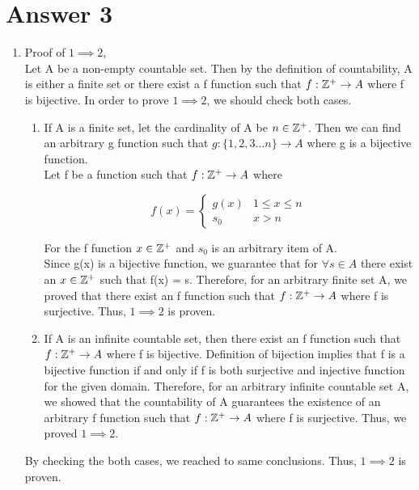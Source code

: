 \documentclass[11pt]{article}
\newcommand{\Z}{\mathbb{Z}}
\begin{document}
\section*{Answer 3}
\begin{enumerate}
	\item
	Proof of $1 \implies 2$, \\
	Let A be a non-empty countable set. Then by the definition of countability, A is either a finite set or there exist a f function such that $f: \Z\textsuperscript{+} \rightarrow A$ where f is bijective. In order to prove $1 \implies 2$, we should check both cases.
	\renewcommand{\theenumii}{\roman{enumii}}
	\begin{enumerate}
	\item
	If A is a finite set, let the cardinality of A be $n \in \Z\textsuperscript{+}$. Then we can find an arbitrary g function such that $g: \{1,2,3...n\} \rightarrow A$ where g is a bijective function.\\
	Let f be a function such that $f: \Z\textsuperscript{+} \rightarrow A$ where 
	
	\[ f(x) = \begin{cases} 
	g(x) & 1\leq x \leq n \\
	s_{0} & x > n
	\end{cases}
	\] 
	
	For the f function $x \in \Z\textsuperscript{+}$ and $s_{0}$ is an arbitrary item of A.\\
	Since g(x) is a bijective function, we guarantee that for $\forall s \in A$ there exist an $x \in \Z\textsuperscript{+}$ such that f(x) = s. Therefore, for an arbitrary finite set A, we proved that there exist an f function such that $f: \Z\textsuperscript{+} \rightarrow A$ where f is surjective. Thus, $1 \implies 2$ is proven.
	
	\item
	If A is an infinite countable set, then there exist an f function such that $f: \Z\textsuperscript{+} \rightarrow A$ where f is bijective. Definition of bijection implies that f is a bijective function if and only if f is both surjective and injective function for the given domain. Therefore, for an arbitrary infinite countable set A, we showed that the countability of A guarantees the existence of an arbitrary f function such that 
    $f: \Z\textsuperscript{+} \rightarrow A$ where f is surjective. Thus, we proved $1 \implies 2$.
	
	 
    \end{enumerate}
	By checking the both cases, we reached to same conclusions. Thus, $1 \implies 2$ is proven.
	

\end{enumerate}
\end{document}
